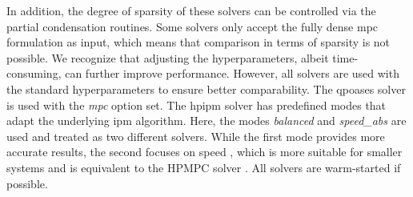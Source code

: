 In addition, the degree of sparsity of these solvers can be controlled via the partial condensation routines.
Some solvers only accept the fully dense \acrshort{mpc} formulation as input, which means that comparison in terms of sparsity is not possible.
We recognize that adjusting the hyperparameters, albeit time-consuming, can further improve performance. However, all solvers are used with the standard hyperparameters to ensure better comparability. The \acrshort{qpoases} solver is used with the \textit{\gls{mpc}} option set. The \gls{hpipm} solver has predefined modes that adapt the underlying \gls{ipm} algorithm. Here, the modes \textit{balanced} and \textit{speed\_abs} are used and treated as two different solvers. While the first mode provides more accurate results, the second focuses on speed \cite{frison_hpipm_2020}, which is more suitable for smaller systems and is equivalent to the HPMPC solver \cite{frison_high-performance_2014}.
All solvers are warm-started if possible. 

